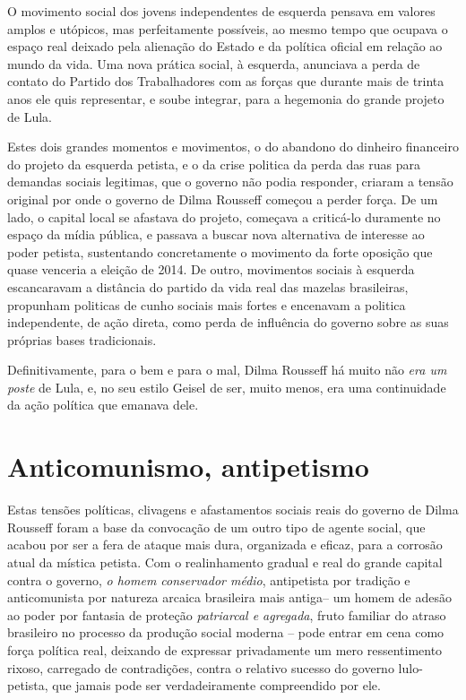 O movimento social dos jovens independentes de esquerda pensava em
valores amplos e utópicos, mas perfeitamente possíveis, ao mesmo tempo
que ocupava o espaço real deixado pela alienação do Estado e da política
oficial em relação ao mundo da vida. Uma nova prática social, à
esquerda, anunciava a perda de contato do Partido dos Trabalhadores com
as forças que durante mais de trinta anos ele quis representar, e soube
integrar, para a hegemonia do grande projeto de Lula.

Estes dois grandes momentos e movimentos, o do abandono do dinheiro
financeiro do projeto da esquerda petista, e o da crise politica da
perda das ruas para demandas sociais legitimas, que o governo não podia
responder, criaram a tensão original por onde o governo de Dilma
Rousseff começou a perder força. De um lado, o capital local se afastava
do projeto, começava a criticá-lo duramente no espaço da mídia pública,
e passava a buscar nova alternativa de interesse ao poder petista,
sustentando concretamente o movimento da forte oposição que quase
venceria a eleição de 2014. De outro, movimentos sociais à esquerda
escancaravam a distância do partido da vida real das mazelas
brasileiras, propunham politicas de cunho sociais mais fortes e
encenavam a politica independente, de ação direta, como perda de
influência do governo sobre as suas próprias bases tradicionais.

Definitivamente, para o bem e para o mal, Dilma Rousseff há muito não
\emph{era um poste} de Lula, e, no seu estilo Geisel de ser, muito
menos, era uma continuidade da ação política que emanava dele.

  \section{Anticomunismo, antipetismo}\label{anticomunismo-antipetismo}

Estas tensões políticas, clivagens e afastamentos sociais reais do
governo de Dilma Rousseff foram a base da convocação de um outro tipo de
agente social, que acabou por ser a fera de ataque mais dura, organizada
e eficaz, para a corrosão atual da mística petista. Com o realinhamento
gradual e real do grande capital contra o governo, \emph{o homem
conservador médio}, antipetista por tradição e anticomunista por
natureza arcaica brasileira mais antiga-- um homem de adesão ao poder
por fantasia de proteção \emph{patriarcal e agregada}, fruto familiar do
atraso brasileiro no processo da produção social moderna -- pode entrar
em cena como força política real, deixando de expressar privadamente um
mero ressentimento rixoso, carregado de contradições, contra o relativo
sucesso do governo lulo-petista, que jamais pode ser verdadeiramente
compreendido por ele.

